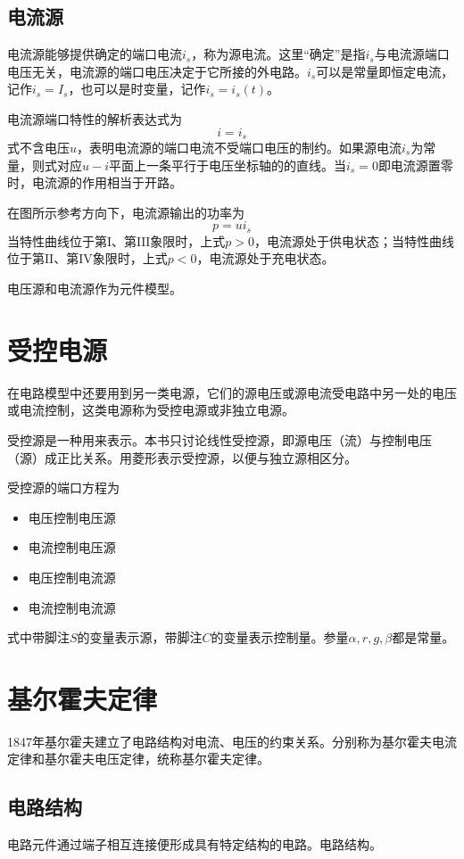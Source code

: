 \subsection{电流源}
电流源能够提供确定的端口电流$i_s$，称为源电流。这里“确定”是指$i_s$与电流源端口电压无关，电流源的端口电压决定于它所接的外电路。$i_s$可以是常量即恒定电流，记作$i_s=I_s$，也可以是时变量，记作$i_s=i_s(t)$。

电流源端口特性的解析表达式为
\[
i=i_s
\]
式不含电压$u$，表明电流源的端口电流不受端口电压的制约。如果源电流$i_s$为常量，则式对应$u-i$平面上一条平行于电压坐标轴的的直线。当$i_s=0$即电流源置零时，电流源的作用相当于开路。

在图所示参考方向下，电流源输出的功率为
\[
p=ui_s
\]
当特性曲线位于第$\mathrm{I}、$第$\mathrm{III}$象限时，上式$p>0$，电流源处于供电状态；当特性曲线位于第$\mathrm{II}、$第$\mathrm{IV}$象限时，上式$p<0$，电流源处于充电状态。

电压源和电流源作为元件模型。

\section{受控电源}
在电路模型中还要用到另一类电源，它们的源电压或源电流受电路中另一处的电压或电流控制，这类电源称为受控电源或非独立电源。

受控源是一种用来表示。本书只讨论线性受控源，即源电压（流）与控制电压（源）成正比关系。用菱形表示受控源，以便与独立源相区分。

受控源的端口方程为
\begin{itemize}
    \item 电压控制电压源
    \item 电流控制电压源
    \item 电压控制电流源
    \item 电流控制电流源
\end{itemize}
式中带脚注$S$的变量表示源，带脚注$C$的变量表示控制量。参量$\alpha,r,g,\beta$都是常量。

\section{基尔霍夫定律}
1847年基尔霍夫建立了电路结构对电流、电压的约束关系。分别称为基尔霍夫电流定律和基尔霍夫电压定律，统称基尔霍夫定律。

\subsection{电路结构}
电路元件通过端子相互连接便形成具有特定结构的电路。电路结构。

